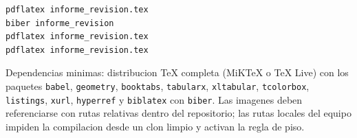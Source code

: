 \documentclass[11pt,a4paper]{article}
\begin{document}
\begin{lstlisting}
pdflatex informe_revision.tex
biber informe_revision
pdflatex informe_revision.tex
pdflatex informe_revision.tex
\end{lstlisting}

\noindent
Dependencias minimas: distribucion TeX completa (MiKTeX o TeX Live) con los paquetes \texttt{babel}, \texttt{geometry}, \texttt{booktabs}, \texttt{tabularx}, \texttt{xltabular}, \texttt{tcolorbox}, \texttt{listings}, \texttt{xurl}, \texttt{hyperref} y \texttt{biblatex} con \texttt{biber}. Las imagenes deben referenciarse con rutas relativas dentro del repositorio; las rutas locales del equipo impiden la compilacion desde un clon limpio y activan la regla de piso.

\clearpage
\printbibliography[title={Referencias}]
\end{document}
